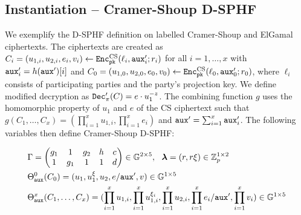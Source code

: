 \subsection{Instantiation -- Cramer-Shoup D-SPHF}\label{sec:dcssphf}
We exemplify the \ac{D-SPHF} definition on labelled Cramer-Shoup and ElGamal ciphertexts.
The ciphertexts are created as $C_i=(u_{1,i},u_{2,i},e_{i},v_i)\gets\mathtt{Enc}^{\mathrm{CS}}_{\mathtt{pk}}(\ell_i,\mathtt{aux}'_i;r_i)$ for all $i=1,\dots,x$ with $\mathtt{aux}'_i=h(\mathtt{aux}')[i]$ and $C_0=(u_{1,0},u_{2,0},\allowbreak e_{0},v_0)\gets\mathtt{Enc}^{\mathrm{CS}}_{\mathtt{pk}}(\ell_0,\allowbreak \mathtt{aux}'_0;r_0)$, where $\ell_i$ consists of participating parties and the party's projection key.
We define modified decryption as $\mathtt{Dec}'_\pi(C)=e\cdot u_1^{-z}$.
The combining function $g$ uses the homomorphic property of $u_1$ and $e$ of the CS ciphertext such that $g(C_1,\dots,C_x)=(\prod^x_{i=1}u_{1,i},\prod^x_{i=1}e_i)$ and $\mathtt{aux}'=\sum_{i=1}^{x}\mathtt{aux}'_i$.
The following variables then define Cramer-Shoup \ac{D-SPHF}:

\begin{align*}
& \Gamma=
		\begin{pmatrix}
			g_1 & 1 & g_2 & h & c \\
			1 & g_1 & 1 & 1 & d
		\end{pmatrix} \in \mathbb{G}^{2\times 5},~~
		{\bm \lambda}=(r, r\xi)\in\mathbb{Z}_p^{1\times 2} \\
& \Theta^0_{\mathtt{aux}}(C_0)=(u_1,u_1^\xi,u_2,e/\mathtt{aux}',v)\in\mathbb{G}^{1\times 5} \\
& \Theta^x_{\mathtt{aux}}(C_1,\dots,C_x)=(\prod^x_{i=1}u_{1,i},\prod^x_{i=1}u_{1,i}^{\xi_i},\prod^x_{i=1}u_{2,i},\prod^x_{i=1}e_i/\mathtt{aux}',\prod^x_{i=1}v_i)\in\mathbb{G}^{1\times 5}
\end{align*}

